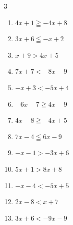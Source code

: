 \begin{multicols}{3}
\begin{enumerate}
        \phantom{$\displaystyle x\geqq 2$}

\columnbreak %

\resetques

  \item $4x+1\geqq -4x+8$


  \item $3x+6\leqq -x+2$

        \phantom{$\displaystyle x\leqq -1$}

  \item $x+9>4x+5$


  \item $7x+7<-8x-9$


  \item $-x+3<-5x+4$


  \item $-6x-7\geqq 4x-9$


  \item $4x-8\geqq -4x+5$


  \item $7x-4\leqq 6x-9$

        \phantom{$\displaystyle x\leqq -5$}

  \item $-x-1>-3x+6$


  \item $5x+1>8x+8$


  \item $-x-4<-5x+5$


  \item $2x-8<x+7$

        \phantom{$\displaystyle x<15$}

  \item $3x+6<-9x-9$


\end{enumerate}
\end{multicols}
